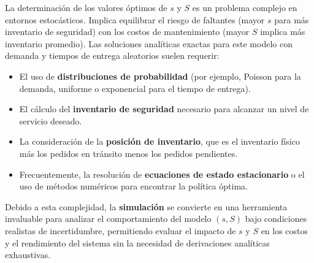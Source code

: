 \documentclass{article}
\begin{document}
La determinación de los valores óptimos de $s$ y $S$ es un problema complejo en entornos estocásticos. Implica equilibrar el riesgo de faltantes (mayor $s$ para más inventario de seguridad) con los costos de mantenimiento (mayor $S$ implica más inventario promedio). Las soluciones analíticas exactas para este modelo con demanda y tiempos de entrega aleatorios suelen requerir:
\begin{itemize}
    \item El uso de \textbf{distribuciones de probabilidad} (por ejemplo, Poisson para la demanda, uniforme o exponencial para el tiempo de entrega).
    \item El cálculo del \textbf{inventario de seguridad} necesario para alcanzar un nivel de servicio deseado.
    \item La consideración de la \textbf{posición de inventario}, que es el inventario físico más los pedidos en tránsito menos los pedidos pendientes.
    \item Frecuentemente, la resolución de \textbf{ecuaciones de estado estacionario} o el uso de métodos numéricos para encontrar la política óptima.
\end{itemize}
Debido a esta complejidad, la \textbf{simulación} se convierte en una herramienta invaluable para analizar el comportamiento del modelo $(s,S)$ bajo condiciones realistas de incertidumbre, permitiendo evaluar el impacto de $s$ y $S$ en los costos y el rendimiento del sistema sin la necesidad de derivaciones analíticas exhaustivas.
\end{document}
